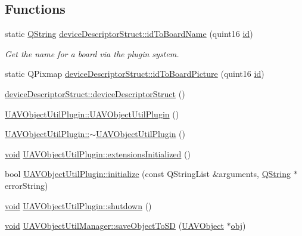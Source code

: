 \subsection*{Functions}
\begin{DoxyCompactItemize}
\item 
static \hyperlink{group___u_a_v_objects_plugin_gab9d252f49c333c94a72f97ce3105a32d}{Q\-String} \hyperlink{group___u_a_v_object_util_plugin_ga7e79b308b3743586bbaed68286e694e6}{device\-Descriptor\-Struct\-::id\-To\-Board\-Name} (quint16 \hyperlink{glext_8h_a58c2a664503e14ffb8f21012aabff3e9}{id})
\begin{DoxyCompactList}\small\item\em Get the name for a board via the plugin system. \end{DoxyCompactList}\item 
static Q\-Pixmap \hyperlink{group___u_a_v_object_util_plugin_ga445e8ccb97ef5d05ed372fbd13532042}{device\-Descriptor\-Struct\-::id\-To\-Board\-Picture} (quint16 \hyperlink{glext_8h_a58c2a664503e14ffb8f21012aabff3e9}{id})
\item 
\hyperlink{group___u_a_v_object_util_plugin_ga09cd541275c17c51873b51573cacbb5d}{device\-Descriptor\-Struct\-::device\-Descriptor\-Struct} ()
\item 
\hyperlink{group___u_a_v_object_util_plugin_ga3b705535aeae994a52c3d401767492c8}{U\-A\-V\-Object\-Util\-Plugin\-::\-U\-A\-V\-Object\-Util\-Plugin} ()
\item 
\hyperlink{group___u_a_v_object_util_plugin_ga1818db06a0b7162d9b933a9418dee8d6}{U\-A\-V\-Object\-Util\-Plugin\-::$\sim$\-U\-A\-V\-Object\-Util\-Plugin} ()
\item 
\hyperlink{group___u_a_v_objects_plugin_ga444cf2ff3f0ecbe028adce838d373f5c}{void} \hyperlink{group___u_a_v_object_util_plugin_ga644ec0f06cf775004f4f5cd28a60080a}{U\-A\-V\-Object\-Util\-Plugin\-::extensions\-Initialized} ()
\item 
bool \hyperlink{group___u_a_v_object_util_plugin_ga21707781be0dfd017ec41e59ef8bf7af}{U\-A\-V\-Object\-Util\-Plugin\-::initialize} (const Q\-String\-List \&arguments, \hyperlink{group___u_a_v_objects_plugin_gab9d252f49c333c94a72f97ce3105a32d}{Q\-String} $\ast$error\-String)
\item 
\hyperlink{group___u_a_v_objects_plugin_ga444cf2ff3f0ecbe028adce838d373f5c}{void} \hyperlink{group___u_a_v_object_util_plugin_ga14d874a44f94ae805fa0d683410ccfcb}{U\-A\-V\-Object\-Util\-Plugin\-::shutdown} ()
\item 
\hyperlink{group___u_a_v_objects_plugin_ga444cf2ff3f0ecbe028adce838d373f5c}{void} \hyperlink{group___u_a_v_object_util_plugin_ga007cecfcbf4a9d18c1f2c9ec13de4222}{U\-A\-V\-Object\-Util\-Manager\-::save\-Object\-To\-S\-D} (\hyperlink{class_u_a_v_object}{U\-A\-V\-Object} $\ast$\hyperlink{glext_8h_a0c0d4701a6c89f4f7f0640715d27ab26}{obj})

\end{DoxyCompactItemize}
